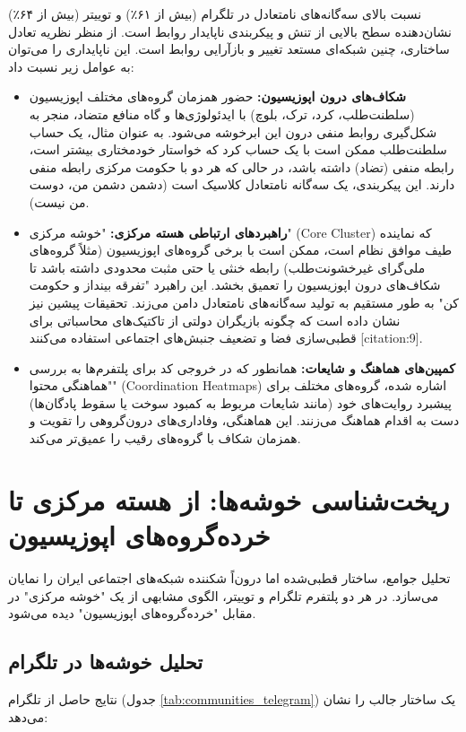 \documentclass{article}
\begin{document}
	نسبت بالای سه‌گانه‌های نامتعادل در تلگرام (بیش از ۶۱٪) و توییتر (بیش از ۶۴٪) نشان‌دهنده سطح بالایی از تنش و پیکربندی ناپایدار روابط است. از منظر نظریه تعادل ساختاری، چنین شبکه‌ای مستعد تغییر و بازآرایی روابط است. این ناپایداری را می‌توان به عوامل زیر نسبت داد:
	
	\begin{itemize}
		\item \textbf{شکاف‌های درون اپوزیسیون:} حضور همزمان گروه‌های مختلف اپوزیسیون (سلطنت‌طلب، کرد، ترک، بلوچ) با ایدئولوژی‌ها و گاه منافع متضاد، منجر به شکل‌گیری روابط منفی درون این ابرخوشه می‌شود. به عنوان مثال، یک حساب سلطنت‌طلب ممکن است با یک حساب کرد که خواستار خودمختاری بیشتر است، رابطه منفی (تضاد) داشته باشد، در حالی که هر دو با حکومت مرکزی رابطه منفی دارند. این پیکربندی، یک سه‌گانه نامتعادل کلاسیک است (دشمن دشمن من، دوست من نیست).
		\item \textbf{راهبردهای ارتباطی هسته مرکزی:} "خوشه مرکزی" (Core Cluster) که نماینده طیف موافق نظام است، ممکن است با برخی گروه‌های اپوزیسیون (مثلاً گروه‌های ملی‌گرای غیرخشونت‌طلب) رابطه خنثی یا حتی مثبت محدودی داشته باشد تا شکاف‌های درون اپوزیسیون را تعمیق بخشد. این راهبرد "تفرقه بینداز و حکومت کن" به طور مستقیم به تولید سه‌گانه‌های نامتعادل دامن می‌زند. تحقیقات پیشین نیز نشان داده است که چگونه بازیگران دولتی از تاکتیک‌های محاسباتی برای قطبی‌سازی فضا و تضعیف جنبش‌های اجتماعی استفاده می‌کنند [citation:9].
		\item \textbf{کمپین‌های هماهنگ و شایعات:} همانطور که در خروجی کد برای پلتفرم‌ها به بررسی "هماهنگی محتوا" (Coordination Heatmaps) اشاره شده، گروه‌های مختلف برای پیشبرد روایت‌های خود (مانند شایعات مربوط به کمبود سوخت یا سقوط پادگان‌ها) دست به اقدام هماهنگ می‌زنند. این هماهنگی، وفاداری‌های درون‌گروهی را تقویت و همزمان شکاف با گروه‌های رقیب را عمیق‌تر می‌کند.
	\end{itemize}
	
	\section{ریخت‌شناسی خوشه‌ها: از هسته مرکزی تا خرده‌گروه‌های اپوزیسیون}
	تحلیل جوامع، ساختار قطبی‌شده اما درون‌اً شکننده شبکه‌های اجتماعی ایران را نمایان می‌سازد. در هر دو پلتفرم تلگرام و توییتر، الگوی مشابهی از یک "خوشه مرکزی" در مقابل "خرده‌گروه‌های اپوزیسیون" دیده می‌شود.
	
	\subsection{تحلیل خوشه‌ها در تلگرام}
	نتایج حاصل از تلگرام (جدول \ref{tab:communities_telegram}) یک ساختار جالب را نشان می‌دهد:
	
\end{document}
